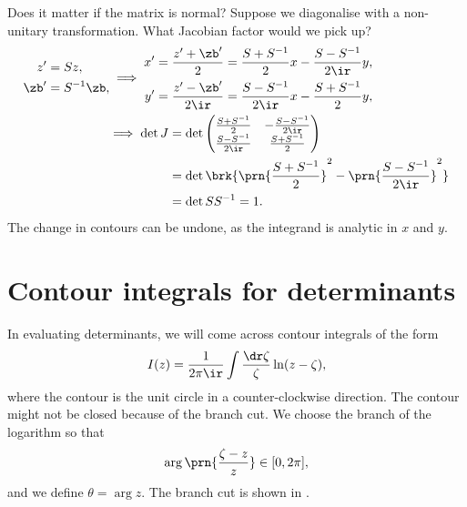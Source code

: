 \documentclass[12pt]{article}
\newcommand{\inv}{^{-1}}
\begin{document}
Does it matter if the matrix is normal?
Suppose we diagonalise with a non-unitary transformation.
What Jacobian factor would we pick up?
%
\begin{equation*}
\begin{aligned}
  \begin{aligned}
    z'   &= Sz, \\
    \zb' &=S\inv\zb,
  \end{aligned}
  &\implies
  \begin{aligned}
    x' &= \frac{z'+\zb'}{2}    = \frac{S+S\inv}{2}x - \frac{S-S\inv}{2\ir}y, \\
    y' &= \frac{z'-\zb'}{2\ir} = \frac{S-S\inv}{2\ir}x - \frac{S+S\inv}{2}y,
  \end{aligned}
  \\ &
  \begin{aligned}
  \implies  \det J &= \det\begin{pmatrix}
                    \frac{S+S\inv}{2}    & -\frac{S-S\inv}{2\ir} \\
                    \frac{S-S\inv}{2\ir} & \frac{S+S\inv}{2} \\
                  \end{pmatrix}
     \\
     &= \det \brk{\prn{\frac{S+S\inv}{2}}^2-\prn{\frac{S-S\inv}{2\ir}}^2}\\
     &=\det S S\inv = 1.
  \end{aligned}
\end{aligned}
\end{equation*}
%
The change in contours can be undone, as the integrand is analytic in $x$ and $y$.


\section{Contour integrals for determinants}\label{sec:contourints}

In evaluating determinants, we will come across contour integrals of the form
%
\begin{equation}\label{eq:contourint}
  I(z) = \frac{1}{2\pi\ir}\int \frac{\dr\zeta}{\zeta} \ln(z-\zeta),
\end{equation}
%
where the contour is the unit circle in a counter-clockwise direction.
The contour might not be closed because of the branch cut.
We choose the branch of the logarithm so that
%
\begin{equation}\label{eq:branch}
  \arg\prn{\frac{\zeta-z}{z}} \in [0,2\pi],
\end{equation}
%
and we define $\theta=\arg z$. The branch cut is shown in .
\end{document}
